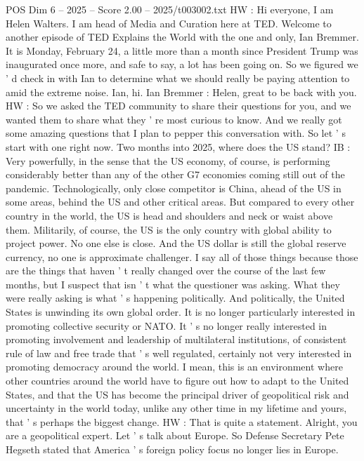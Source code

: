 \begin{textsample}{POS Dim 6 – 2025 – Score 2.00 – 2025/t003002.txt}  \label{ex:f6_pos_056}
HW : Hi everyone, I am Helen Walters.
I am head of Media and Curation here at TED.
Welcome to another episode of TED Explains the World with the one and only, Ian Bremmer.
It is Monday, February 24, a little more than a month since President Trump was inaugurated once more, and safe to say, a lot has been going on.
So we figured we ' d check in with Ian to determine what we should really be paying attention to amid the extreme noise.
Ian, hi.
Ian Bremmer : Helen, great to be back with you.
HW : So we asked the TED community to share their questions for you, and we wanted them to share what they ' re most curious to know.
And we really got some amazing questions that I plan to pepper this conversation with.
So let ' s start with one right now.
Two months into 2025, where does the US stand?
IB : Very powerfully, in the sense that the US economy, of course, is performing considerably better than any of the other G7 economies coming still out of the pandemic.
Technologically, only close competitor is China, ahead of the US in some areas, behind the US and other critical areas.
But compared to every other country in the world, the US is head and shoulders and neck or waist above them.
Militarily, of course, the US is the only country with global ability to project power.
No one else is close.
And the US dollar is still the global reserve currency, no one is approximate challenger.
I say all of those things because those are the things that haven ' t really changed over the course of the last few months, but I suspect that isn ' t what the questioner was asking.
What they were really asking is what ' s happening politically.
And politically, the United States is unwinding its own global order.
It is no longer particularly interested in promoting collective security or NATO.
It ' s no longer really interested in promoting involvement and leadership of multilateral institutions, of consistent rule of law and free trade that ' s well regulated, certainly not very interested in promoting democracy around the world.
I mean, this is an environment where other countries around the world have to figure out how to adapt to the United States, and that the US has become the principal driver of geopolitical risk and uncertainty in the world today, unlike any other time in my lifetime and yours, that ' s perhaps the biggest change.
HW : That is quite a statement.
Alright, you are a geopolitical expert.
Let ' s talk about Europe.
So Defense Secretary Pete Hegseth stated that America ' s foreign policy focus no longer lies in Europe.

\end{textsample}

